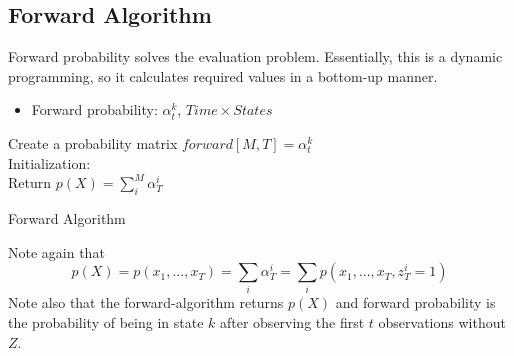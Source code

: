 \subsection{Forward Algorithm}
Forward probability solves the evaluation problem. Essentially, this is a dynamic programming, so it calculates required values in a bottom-up manner. 
\begin{itemize}
	\item Forward probability: $\alpha_t^k$, $Time\times States$
\end{itemize}
\begin{algorithm}
	Create a probability matrix $forward[M,T] = \alpha_t^k$\\
	Initialization: \\
	Return $p(X) = \sum_i^M \alpha_T^i$
	\caption{Forward Algorithm}
	\label{algo:forward_algorithm}
\end{algorithm}
Note again that 
$$p(X) = p(x_1,...,x_T) =\sum_i\alpha_T^i = \sum_i p(x_1,...,x_T, z_T^i=1)$$
Note also that the forward-algorithm returns $p(X)$ and forward probability is the probability of being in state $k$ after observing the first $t$ observations without $Z$. 


